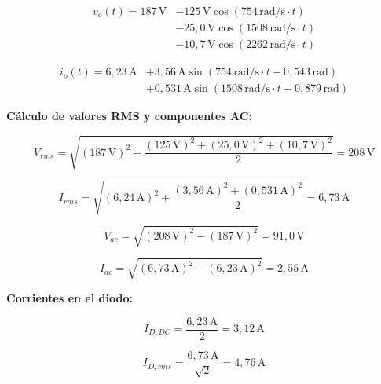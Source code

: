 \documentclass[12pt,a4paper]{article}
\begin{document}
\begin{equation}
\begin{split}
    v_o(t) = 187\,\text{V} &- 125\,\text{V}\cos(754\,\text{rad/s}\cdot t) \\
    &- 25{,}0\,\text{V}\cos(1508\,\text{rad/s}\cdot t) \\
    &- 10{,}7\,\text{V}\cos(2262\,\text{rad/s}\cdot t)
\end{split}
\end{equation}

\begin{equation}
\begin{split}
    i_o(t) = 6{,}23\,\text{A} &+ 3{,}56\,\text{A}\sin(754\,\text{rad/s}\cdot t - 0{,}543\,\text{rad}) \\
    &+ 0{,}531\,\text{A}\sin(1508\,\text{rad/s}\cdot t - 0{,}879\,\text{rad})
\end{split}
\end{equation}

\textbf{Cálculo de valores RMS y componentes AC:}

\begin{equation}
    V_{rms} = \sqrt{(187\,\text{V})^2 + \frac{(125\,\text{V})^2 + (25{,}0\,\text{V})^2 + (10{,}7\,\text{V})^2}{2}} = 208\,\text{V}
\end{equation}

\begin{equation}
    I_{rms} = \sqrt{(6{,}24\,\text{A})^2 + \frac{(3{,}56\,\text{A})^2 + (0{,}531\,\text{A})^2}{2}} = 6{,}73\,\text{A}
\end{equation}

\begin{equation}
    V_{ac} = \sqrt{(208\,\text{V})^2 - (187\,\text{V})^2} = 91{,}0\,\text{V}
\end{equation}

\begin{equation}
    I_{ac} = \sqrt{(6{,}73\,\text{A})^2 - (6{,}23\,\text{A})^2} = 2{,}55\,\text{A}
\end{equation}

\textbf{Corrientes en el diodo:}

\begin{equation}
    I_{D,DC} = \frac{6{,}23\,\text{A}}{2} = 3{,}12\,\text{A}
\end{equation}

\begin{equation}
    I_{D,rms} = \frac{6{,}73\,\text{A}}{\sqrt{2}} = 4{,}76\,\text{A}
\end{equation}
\end{document}
